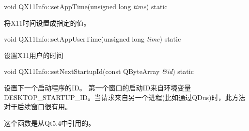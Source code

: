 \begin{itemSpace}
	void QX11Info::setAppTime(unsigned long \emph{time}) static

	将X11时间设置成指定的值。
\end{itemSpace}

\begin{itemSpace}
	void QX11Info::setAppUserTime(unsigned long \emph{time}) static

	设置X11用户的时间
\end{itemSpace}

\begin{itemSpace}
	void QX11Info::setNextStartupId(const QByteArray \emph{\&id}) static

	设置下一个启动程序的ID。 第一个窗口的启动ID来自环境变量DESKTOP\_STARTUP\_ID。当请求来自另一个进程(比如通过QDus)时，此方法对于后续窗口很有用。

	这个函数是从Qt5.4中引用的。
\end{itemSpace}